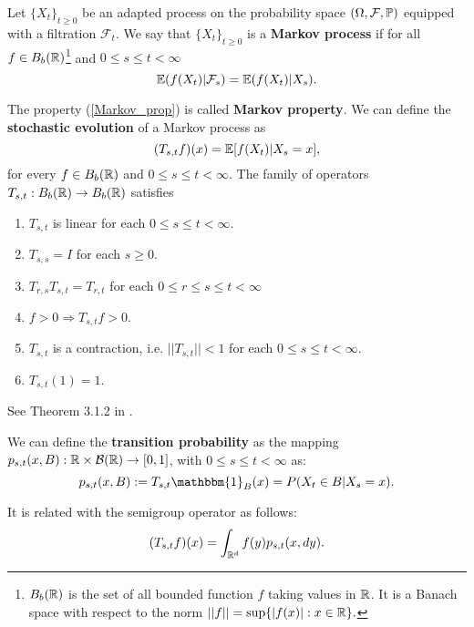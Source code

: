 \begin{Definition}
 Let $\{X_t\}_{t \ge 0}$  be an adapted process on the probability space $(\Omega,\mathcal{F},\mathbb{P})$ equipped with a filtration $\mathcal{F}_t$.
 We say that $\{X_t\}_{t \ge 0}$ is a \textbf{Markov process} if for all $f\in B_b(\mathbb{R})$\footnote{$B_b(\mathbb{R})$ 
 is the set of all bounded function $f$ taking values in $\mathbb{R}$. It is a Banach space with respect to the norm 
 $ ||f|| = \sup\{ |f(x)| : x\in \mathbb{R} \}. $} 
 and $0\leq s \leq t < \infty$
 \begin{equation} \label{Markov_prop}
  \mathbb{E}(f(X_t)|\mathcal{F}_s) = \mathbb{E}(f(X_t)|X_s).
 \end{equation}
\end{Definition}
The property (\ref{Markov_prop}) is called \textbf{Markov property}.
We can define the \textbf{stochastic evolution} of a Markov process as 
\begin{equation}\label{stoch_evolution}
 (T_{s,t}f)(x) = \mathbb{E}[f(X_t) |X_s = x],
\end{equation}
for every $f \in B_b(\mathbb{R})$ and $0\leq s \leq t < \infty$.
The family of operators $T_{s,t} : B_b(\mathbb{R}) \to B_b(\mathbb{R})$ satisfies  
\begin{enumerate}
 \item $T_{s,t}$ is linear for each $0\leq s \leq t < \infty$.
 \item $ T_{s,s} = I $ for each $s \geq 0$.
 \item $T_{r,s} T_{s,t} = T_{r,t}$ for each $0\leq r \leq s \leq t < \infty$
 \item $f>0 \Rightarrow T_{s,t}f >0$.
 \item $T_{s,t}$ is a contraction, i.e. $||T_{s,t}||<1$ for each $0\leq s \leq t < \infty$.
 \item $T_{s,t} (1) = 1$.
\end{enumerate}
See Theorem 3.1.2 in \cite{Applebaum}.
\begin{Definition}\label{trans_prob}
We can define the \textbf{transition probability} as the mapping $p_{s,t}(x,B) : \mathbb{R} \times \mathcal{B}(\mathbb{R}) \to [0,1]$, 
with $0\leq s \leq t < \infty$ as: 
\begin{equation}
 p_{s,t}(x,B) := T_{s,t} \mathbbm{1}_B(x) = P(X_t \in B | X_s=x).
\end{equation}
\end{Definition}
It is related with the semigroup operator as follows:
\begin{equation}\label{evolution}
 (T_{s,t}f)(x) = \int_{\mathbb{R}^d} f(y) p_{s,t}(x,dy). 
\end{equation}
